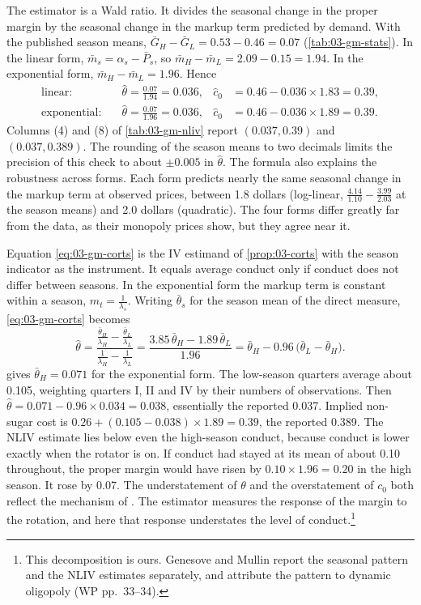 The estimator is a Wald ratio. It divides the seasonal change in the proper margin by the seasonal change in
the markup term predicted by demand. With the published season means, $\bar G_H - \bar G_L = 0.53 - 0.46 =
0.07$ (\cref{tab:03-gm-stats}). In the linear form, $\bar m_s = \alpha_s - \bar P_s$, so $\bar m_H - \bar m_L
= 2.09 - 0.15 = 1.94$. In the exponential form, $\bar m_H - \bar m_L = 1.96$. Hence
\begin{align*}
\text{linear:}\quad & \hat\theta = \frac{0.07}{1.94} = 0.036, &
\hat c_0 &= 0.46 - 0.036 \times 1.83 = 0.39,\\
\text{exponential:}\quad & \hat\theta = \frac{0.07}{1.96} = 0.036, &
\hat c_0 &= 0.46 - 0.036 \times 1.89 = 0.39 .
\end{align*}
Columns (4) and (8) of \cref{tab:03-gm-nliv} report $(0.037, 0.39)$ and $(0.037, 0.389)$. The rounding of the
season means to two decimals limits the precision of this check to about $\pm 0.005$ in $\hat\theta$. The
formula also explains the robustness across forms. Each form predicts nearly the same seasonal change in
the markup term at observed prices, between 1.8 dollars (log-linear, $\frac{4.14}{1.10} - \frac{3.99}{2.03}$
at the season means) and 2.0 dollars (quadratic). The four forms differ greatly far from the
data, as their monopoly prices show, but they agree near it.

Equation \eqref{eq:03-gm-corts} is the IV estimand of \cref{prop:03-corts} with the season indicator as the
instrument. It equals average conduct only if conduct does not differ between seasons. In the exponential
form the markup term is constant within a season, $m_t = \frac{1}{\lambda_s}$. Writing $\bar\theta_s$ for the
season mean of the direct measure, \eqref{eq:03-gm-corts} becomes
\begin{equation*}
\hat\theta
= \frac{\frac{\bar\theta_H}{\lambda_H} - \frac{\bar\theta_L}{\lambda_L}}{\frac{1}{\lambda_H} - \frac{1}{\lambda_L}}
= \frac{3.85\,\bar\theta_H - 1.89\,\bar\theta_L}{1.96}
= \bar\theta_H - 0.96\,\big(\bar\theta_L - \bar\theta_H\big).
\end{equation*}
 gives $\bar\theta_H = 0.071$ for the exponential form. The low-season quarters
average about 0.105, weighting quarters I, II and IV by their numbers of observations. Then $\hat\theta = 0.071 - 0.96 \times 0.034 = 0.038$, essentially the reported
0.037. Implied non-sugar cost is $0.26 + (0.105 - 0.038) \times 1.89 = 0.39$, the reported 0.389. The
NLIV estimate lies below even the high-season conduct, because conduct is lower exactly when the rotator is
on. If conduct had stayed at its mean of about 0.10 throughout, the proper margin would have risen by
$0.10 \times 1.96 = 0.20$ in the high season. It rose by 0.07. The understatement of $\theta$ and the
overstatement of $c_0$ both reflect the mechanism of \citet{Corts1999}. The estimator measures the response of
the margin to the rotation, and here that response understates the level of conduct.\footnote{This decomposition is ours. Genesove and Mullin
report the seasonal pattern and the NLIV estimates separately, and attribute the pattern to dynamic
oligopoly (WP pp.~33--34).}

